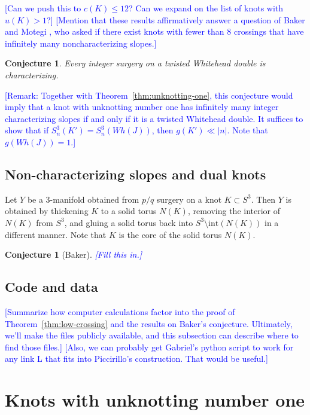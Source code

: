 \documentclass[11pt,usenames,dvipsnames,reqno]{amsart}
\numberwithin{theorem}{section}
\newtheorem{conjecture}[theorem]{Conjecture}
\theoremstyle{ex}
\theoremstyle{rem}
\def\kh#1{\textcolor{Blue}{#1}}
\begin{document}
\kh{[Can we push this to $c(K)\leq 12$? Can we expand on the list of knots with $u(K)>1$?]} 
\kh{[Mention that these results affirmatively answer a question of Baker and Motegi \cite[Question~1.7]{baker-motegi}, who asked if there exist knots with fewer than 8 crossings that have infinitely many noncharacterizing slopes.]}


\begin{conjecture}
Every integer surgery on a twisted Whitehead double is characterizing.
\end{conjecture}

\kh{[Remark: Together with Theorem~\ref{thm:unknotting-one}, this conjecture would imply that a knot with unknotting number one has infinitely many integer characterizing slopes if and only if it is a twisted Whitehead double. It suffices to show that if $S^3_n(K')=S^3_n(Wh(J))$, then $g(K')\ll |n|$. Note that $g(Wh(J))=1$.]}






\subsection{Non-characterizing slopes and dual knots} Let $Y$ be a 3-manifold obtained from $p/q$ surgery on a knot $K\subset S^3$. Then $Y$ is obtained by thickening $K$ to a solid torus $N(K)$, removing the interior of $N(K)$ from $S^3$, and gluing a solid torus back into $S^3\setminus\mathrm{int}(N(K))$ in a different manner. Note that $K$ is the core of the solid torus $N(K)$.

\begin{conjecture}[Baker]
\kh{[Fill this in.]}
\end{conjecture}

\subsection{Code and data} \kh{[Summarize how computer calculations factor into the proof of Theorem~\ref{thm:low-crossing} and the results on Baker's conjecture. Ultimately, we'll make the files publicly available, and this subsection can describe where to find those files.]} \kh{[Also, we can probably get Gabriel's python script to work for any link L that fits into Piccirillo's construction. That would be useful.]}



\section{Knots with unknotting number one}\label{sec:unknotting-one}
\end{document}
